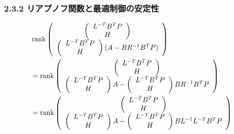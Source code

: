 \begin{frame}[t]
\frametitle{2.3.2 リアプノフ関数と最適制御の安定性}
{\footnotesize
\begin{align}
	&\rank \left(\begin{array}{c} \left(\begin{array}{c} L^{-T} B^T P \\ H \end{array}\right) \\
                            \left(\begin{array}{c} L^{-T} B^T P \\ H \end{array}\right) (A - B R^{-1} B^T P)
               \end{array}\right)
\nonumber \\
	&=
	\rank \left(\begin{array}{c} \left(\begin{array}{c} L^{-T} B^T P \\ H \end{array}\right) \\
                            \left(\begin{array}{c} L^{-T} B^T P \\ H \end{array}\right) A
                          - \left(\begin{array}{c} L^{-T} B^T P \\ H \end{array}\right) B R^{-1} B^T P
               \end{array}\right)
\nonumber \\
	&=
	\rank \left(\begin{array}{c} \left(\begin{array}{c} L^{-T} B^T P \\ H \end{array}\right) \\
                            \left(\begin{array}{c} L^{-T} B^T P \\ H \end{array}\right) A
                          - \left(\begin{array}{c} L^{-T} B^T P \\ H \end{array}\right) B L^{-1} L^{-T} B^T P
               \end{array}\right)

\end{align}}
\end{frame}
